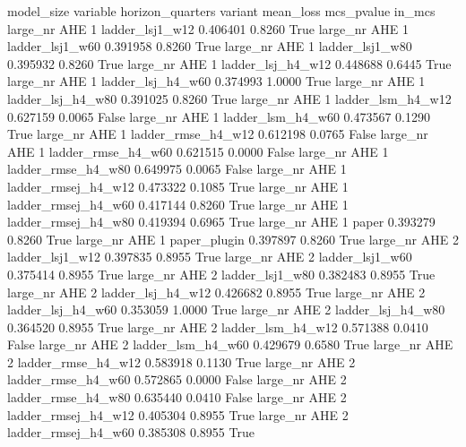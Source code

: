 model_size variable  horizon_quarters             variant  mean_loss  mcs_pvalue  in_mcs
  large_nr      AHE                 1     ladder_lsj1_w12   0.406401      0.8260    True
  large_nr      AHE                 1     ladder_lsj1_w60   0.391958      0.8260    True
  large_nr      AHE                 1     ladder_lsj1_w80   0.395932      0.8260    True
  large_nr      AHE                 1   ladder_lsj_h4_w12   0.448688      0.6445    True
  large_nr      AHE                 1   ladder_lsj_h4_w60   0.374993      1.0000    True
  large_nr      AHE                 1   ladder_lsj_h4_w80   0.391025      0.8260    True
  large_nr      AHE                 1   ladder_lsm_h4_w12   0.627159      0.0065   False
  large_nr      AHE                 1   ladder_lsm_h4_w60   0.473567      0.1290    True
  large_nr      AHE                 1  ladder_rmse_h4_w12   0.612198      0.0765   False
  large_nr      AHE                 1  ladder_rmse_h4_w60   0.621515      0.0000   False
  large_nr      AHE                 1  ladder_rmse_h4_w80   0.649975      0.0065   False
  large_nr      AHE                 1 ladder_rmsej_h4_w12   0.473322      0.1085    True
  large_nr      AHE                 1 ladder_rmsej_h4_w60   0.417144      0.8260    True
  large_nr      AHE                 1 ladder_rmsej_h4_w80   0.419394      0.6965    True
  large_nr      AHE                 1               paper   0.393279      0.8260    True
  large_nr      AHE                 1        paper_plugin   0.397897      0.8260    True
  large_nr      AHE                 2     ladder_lsj1_w12   0.397835      0.8955    True
  large_nr      AHE                 2     ladder_lsj1_w60   0.375414      0.8955    True
  large_nr      AHE                 2     ladder_lsj1_w80   0.382483      0.8955    True
  large_nr      AHE                 2   ladder_lsj_h4_w12   0.426682      0.8955    True
  large_nr      AHE                 2   ladder_lsj_h4_w60   0.353059      1.0000    True
  large_nr      AHE                 2   ladder_lsj_h4_w80   0.364520      0.8955    True
  large_nr      AHE                 2   ladder_lsm_h4_w12   0.571388      0.0410   False
  large_nr      AHE                 2   ladder_lsm_h4_w60   0.429679      0.6580    True
  large_nr      AHE                 2  ladder_rmse_h4_w12   0.583918      0.1130    True
  large_nr      AHE                 2  ladder_rmse_h4_w60   0.572865      0.0000   False
  large_nr      AHE                 2  ladder_rmse_h4_w80   0.635440      0.0410   False
  large_nr      AHE                 2 ladder_rmsej_h4_w12   0.405304      0.8955    True
  large_nr      AHE                 2 ladder_rmsej_h4_w60   0.385308      0.8955    True
